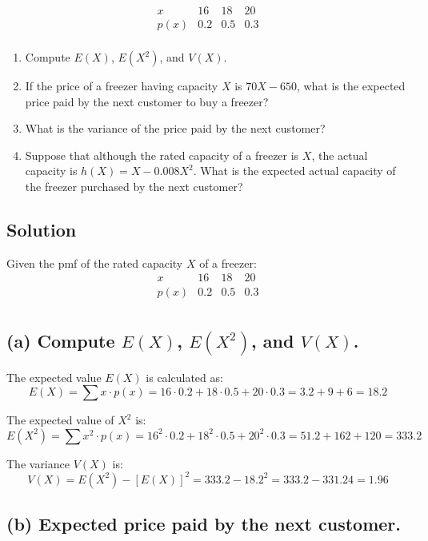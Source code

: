 \documentclass{article}
\begin{document}
\[
\begin{array}{cccc}
x & 16 & 18 & 20 \\
p(x) & 0.2 & 0.5 & 0.3 \\
\end{array}
\]

\begin{enumerate}
    \item Compute \(E(X)\), \(E(X^2)\), and \(V(X)\).
    \item If the price of a freezer having capacity \(X\) is \(70X - 650\), what is the expected price paid by the next customer to buy a freezer?
    \item What is the variance of the price paid by the next customer?
    \item Suppose that although the rated capacity of a freezer is \(X\), the actual capacity is \(h(X) = X - 0.008X^2\). What is the expected actual capacity of the freezer purchased by the next customer?
\end{enumerate}

\subsection*{Solution}
Given the pmf of the rated capacity \(X\) of a freezer:
\[
\begin{array}{c|ccc}
x & 16 & 18 & 20 \\
\hline
p(x) & 0.2 & 0.5 & 0.3 \\
\end{array}
\]

\subsection*{(a) Compute \(E(X)\), \(E(X^2)\), and \(V(X)\).}

The expected value \(E(X)\) is calculated as:
\[
E(X) = \sum x \cdot p(x) = 16 \cdot 0.2 + 18 \cdot 0.5 + 20 \cdot 0.3 = 3.2 + 9 + 6 = 18.2
\]

The expected value of \(X^2\) is:
\[
E(X^2) = \sum x^2 \cdot p(x) = 16^2 \cdot 0.2 + 18^2 \cdot 0.5 + 20^2 \cdot 0.3 = 51.2 + 162 + 120 = 333.2
\]

The variance \(V(X)\) is:
\[
V(X) = E(X^2) - [E(X)]^2 = 333.2 - 18.2^2 = 333.2 - 331.24 = 1.96
\]

\subsection*{(b) Expected price paid by the next customer.}
\end{document}
